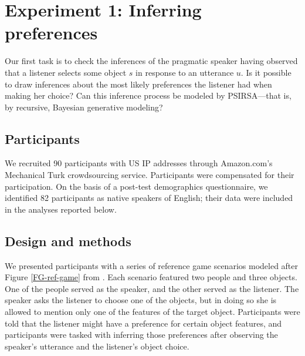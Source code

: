 \documentclass[10pt,a4paper]{article}
\begin{document}
\section{Experiment 1: Inferring preferences}

Our first task is to check the inferences of the pragmatic speaker having observed that a listener selects some object $s$ in response to an utterance $u$. 
Is it possible to draw inferences about the most likely preferences the listener had when making her choice? 
Can this inference process be modeled by PSIRSA---that is, by recursive, Bayesian generative modeling?


\subsection{Participants}

We recruited 90 participants with US IP addresses through Amazon.com's Mechanical Turk crowdsourcing service. Participants were compensated for their participation. On the basis of a post-test demographics questionnaire, we identified 82 participants as native speakers of English; their data were included in the analyses reported below.

\subsection{Design and methods}

We presented participants with a series of reference game scenarios modeled after Figure \ref{FG-ref-game} from . Each scenario featured two people and three objects. One of the people served as the speaker, and the other served as the listener. The speaker asks the listener to choose one of the objects, but in doing so she is allowed to mention only one of the features of the target object. Participants were told that the listener might have a preference for certain object features, and participants were tasked with inferring those preferences after observing the speaker's utterance and the listener's object choice.
\end{document}
